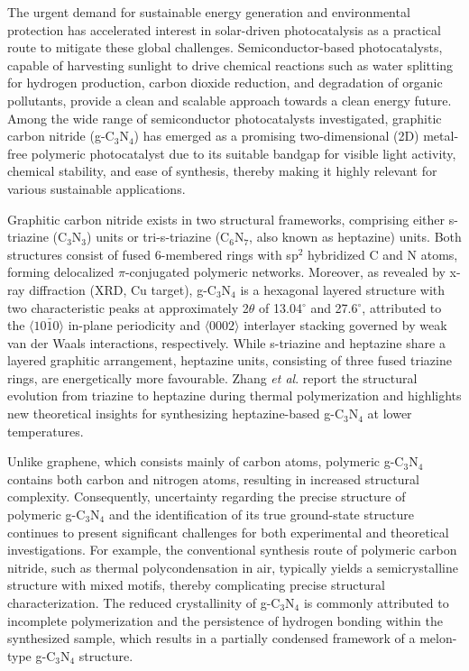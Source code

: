 The urgent demand for sustainable energy generation and environmental protection has accelerated interest in solar-driven photocatalysis as a practical route to mitigate these global challenges.\cite{Tong2025RecentPhotocatalysis} Semiconductor-based photocatalysts, capable of harvesting sunlight to drive chemical reactions such as water splitting for hydrogen production, carbon dioxide reduction, and degradation of organic pollutants, provide a clean and scalable approach towards a clean energy future.\cite{Tofil2025ModifiedReview} Among the wide range of semiconductor photocatalysts investigated, graphitic carbon nitride (g-C$_3$N$_4$) has emerged as a promising two-dimensional (2D) metal-free polymeric photocatalyst due to its suitable bandgap for visible light activity, chemical stability, and ease of synthesis, thereby making it highly relevant for various sustainable applications.\cite{Fang2025VersatileApplications,Khan2025RecentReview}

Graphitic carbon nitride exists in two structural frameworks, comprising either s-triazine (C$_3$N$_3$) units or tri-s-triazine (C$_6$N$_7$, also known as heptazine) units. Both structures consist of fused 6-membered rings with sp$^2$ hybridized C and N atoms, forming delocalized $\pi$-conjugated polymeric networks. 
Moreover, as revealed by x-ray diffraction (XRD, Cu target), g-C$_3$N$_4$ is a hexagonal layered structure with two characteristic peaks at approximately 2$\theta$ of 13.04$^\circ$ and 27.6$^\circ$, attributed to the $\langle 10\bar{1}0 \rangle$ in-plane periodicity and $\langle 0002 \rangle$ interlayer stacking governed by weak van der Waals interactions, respectively. While s-triazine and heptazine share a layered graphitic arrangement, heptazine units, consisting of three fused triazine rings, are energetically more favourable.\cite{Zhao2023Two-dimensionalProcesses,PhuongLy2025DecipheringWater,Rizwan2025RoleApplications} Zhang \textit{et al}.\cite{Zhang2025FunctionalNitride} report the structural evolution from triazine to heptazine during thermal polymerization and highlights new theoretical insights for synthesizing heptazine-based g-C$_3$N$_4$ at lower temperatures.

Unlike graphene, which consists mainly of carbon atoms, polymeric g-C$_3$N$_4$ contains both carbon and nitrogen atoms, resulting in increased structural complexity. Consequently, uncertainty regarding the precise structure of polymeric g-C$_3$N$_4$ and the identification of its true ground-state structure continues to present significant challenges for both experimental and theoretical investigations. For example, the conventional synthesis route of polymeric carbon nitride, such as thermal polycondensation in air, typically yields a semicrystalline structure with mixed motifs, thereby complicating precise structural characterization.\cite{Negro2023CombinedProperties}
The reduced crystallinity of g-C$_3$N$_4$ is commonly attributed to incomplete polymerization and the persistence of hydrogen bonding within the synthesized sample, which results in a partially condensed framework of a melon-type g-C$_3$N$_4$ structure.\cite{Im2023StructureSimulations}


